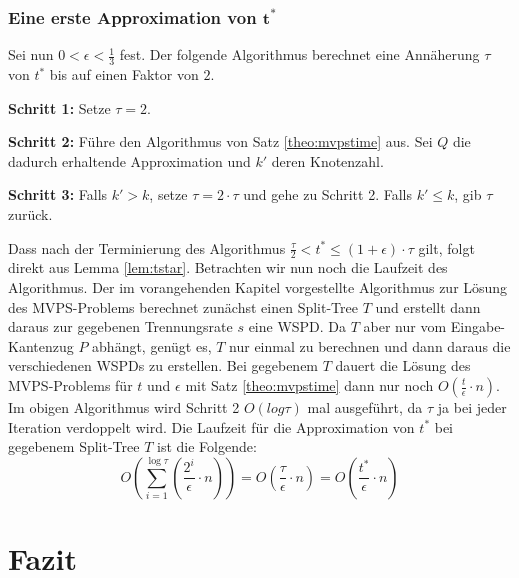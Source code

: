 \documentclass[11pt]{article}
\begin{document}
	\subsubsection*{Eine erste Approximation von $\mathbf{t^*}$}
	
	Sei nun $0 < \epsilon < \frac{1}{3}$ fest.
	Der folgende Algorithmus berechnet eine Annäherung $\tau$ von $t^*$ bis auf einen Faktor von $2$.
	\begin{description}
		\item{\textbf{Schritt 1:}} Setze $\tau = 2$.
		\item{\textbf{Schritt 2:}} Führe den Algorithmus von Satz \ref{theo:mvpstime} aus. Sei $Q$ die dadurch erhaltende Approximation und $k'$ deren Knotenzahl.
		\item{\textbf{Schritt 3:}} Falls $k' > k$, setze $\tau = 2 \cdot \tau$ und gehe zu Schritt 2.
		Falls $k' \leq k$, gib $\tau$ zurück.
	\end{description}
	
	Dass nach der Terminierung des Algorithmus $\frac{\tau}{2} < t^* \leq (1 + \epsilon) \cdot \tau$ gilt, folgt direkt aus Lemma \ref{lem:tstar}. 
	Betrachten wir nun noch die Laufzeit des Algorithmus. 
	Der im vorangehenden Kapitel vorgestellte Algorithmus zur Lösung des MVPS-Problems berechnet zunächst einen Split-Tree $T$ und erstellt dann daraus zur gegebenen Trennungsrate $s$ eine WSPD. 
	Da $T$ aber nur vom Eingabe-Kantenzug $P$ abhängt, genügt es, $T$ nur einmal zu berechnen und dann daraus die verschiedenen WSPDs zu erstellen.
	Bei gegebenem $T$ dauert die Lösung des MVPS-Problems für $t$ und $\epsilon$ mit Satz \ref{theo:mvpstime} dann nur noch $O(\frac{t}{\epsilon}\cdot n)$.
	Im obigen Algorithmus wird Schritt 2 $O(log \tau)$ mal ausgeführt, da $\tau$ ja bei jeder Iteration verdoppelt wird.
	Die Laufzeit für die Approximation von $t^*$ bei gegebenem Split-Tree $T$ ist die Folgende:
	\[
	O(\sum_{i=1}^{\log \tau} (\frac{2^i}{\epsilon}\cdot n))
	= O(\frac{\tau}{\epsilon}\cdot n)
	= O(\frac{t^*}{\epsilon}\cdot n)
	\]
	
	
	\section{Fazit}
    \label{sec:fazit}

    
    
\end{document}
